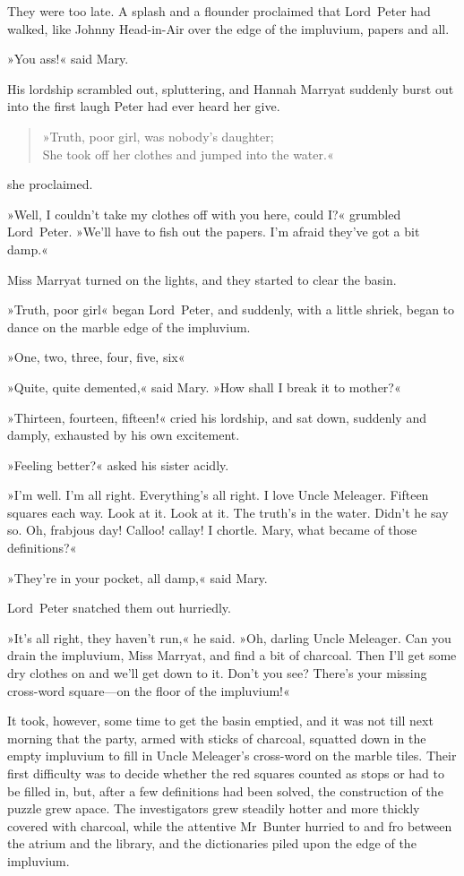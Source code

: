 They were too late. A splash and a flounder proclaimed that Lord~Peter had walked, like Johnny Head-in-Air over the edge of the impluvium, papers and all.

»You ass!« said Mary.

His lordship scrambled out, spluttering, and Hannah Marryat suddenly burst out into the first laugh Peter had ever heard her give.

\begin{quote}
»Truth, poor girl, was nobody's daughter;\\
She took off her clothes and jumped into the water.«
\end{quote}
she proclaimed.

»Well, I couldn't take my clothes off with you here, could I?« grumbled Lord~Peter. »We'll have to fish out the papers. I'm afraid they've got a bit damp.«

Miss Marryat turned on the lights, and they started to clear the basin.

»Truth, poor girl\longdash« began Lord~Peter, and suddenly, with a little shriek, began to dance on the marble edge of the impluvium.

»One, two, three, four, five, six\longdash«

»Quite, quite demented,« said Mary. »How shall I break it to mother?«

»Thirteen, fourteen, fifteen!« cried his lordship, and sat down, suddenly and damply, exhausted by his own excitement.

»Feeling better?« asked his sister acidly.

»I'm well. I'm all right. Everything's all right. I love Uncle Meleager. Fifteen squares each way. Look at it. Look at it. The truth's in the water. Didn't he say so. Oh, frabjous day! Calloo! callay! I chortle. Mary, what became of those definitions?«

»They're in your pocket, all damp,« said Mary.

Lord~Peter snatched them out hurriedly.

»It's all right, they haven't run,« he said. »Oh, darling Uncle Meleager. Can you drain the impluvium, Miss Marryat, and find a bit of charcoal. Then I'll get some dry clothes on and we'll get down to it. Don't you see? There's your missing cross-word square—on the floor of the impluvium!«

It took, however, some time to get the basin emptied, and it was not till next morning that the party, armed with sticks of charcoal, squatted down in the empty impluvium to fill in Uncle Meleager's cross-word on the marble tiles. Their first difficulty was to decide whether the red squares counted as stops or had to be filled in, but, after a few definitions had been solved, the construction of the puzzle grew apace. The investigators grew steadily hotter and more thickly covered with charcoal, while the attentive Mr~Bunter hurried to and fro between the atrium and the library, and the dictionaries piled upon the edge of the impluvium.

